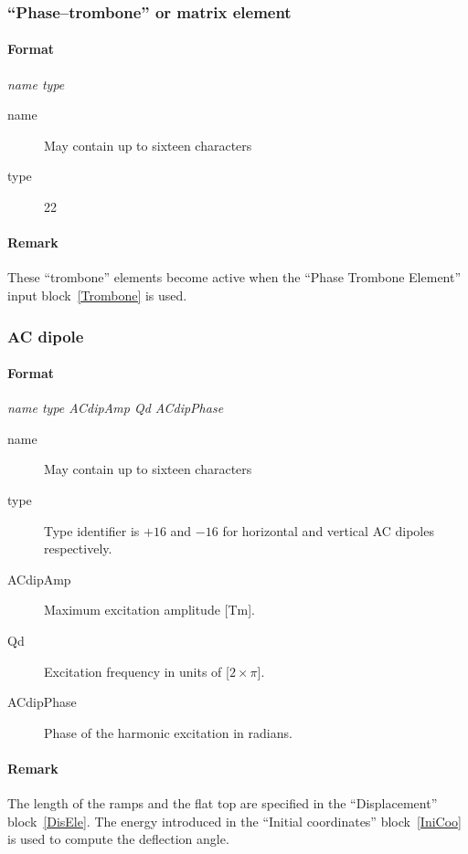 \documentclass[a4paper,11pt]{report}
\begin{document}

\subsubsection{``Phase--trombone'' or matrix element} \label{PT}
\paragraph{Format} {\em name type}
\begin{description}
\item [name] May contain up to sixteen characters
\item [type] 22
\end{description}

\paragraph{Remark}
These ``trombone'' elements become active when the
``Phase Trombone Element'' input block~\ref{Trombone} is used.

\subsubsection{AC dipole} \label{ACDIP}
\paragraph{Format} {\em name type ACdipAmp Qd ACdipPhase}
\begin{description}
\item [name] May contain up to sixteen characters
\item [type] Type identifier is $+16$ and $-16$ for horizontal and vertical
  AC dipoles respectively.
\item [ACdipAmp] Maximum excitation amplitude [Tm].
\item [Qd] Excitation frequency in units of [$2 \times \pi$]. 
\item [ACdipPhase] Phase of the harmonic excitation in radians.
\end{description}

\paragraph{Remark}
The length of the ramps and the flat top are specified in the
``Displacement'' block~\ref{DisEle}. The energy introduced in the
``Initial coordinates'' block~\ref{IniCoo} is used to compute the 
deflection angle.
\end{document}
